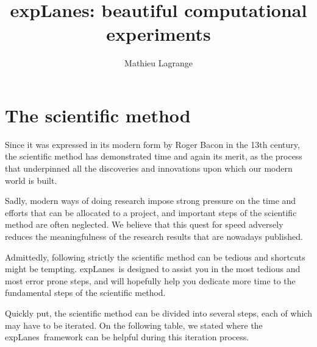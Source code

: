 \documentclass[a4paper,fleqn]{tufte-handout}
\title{ expLanes: beautiful computational experiments }
\author{ Mathieu Lagrange }
\makeatletter
\newcommand{\explanes}{\textsf{expLanes}\ }
\renewcommand{\tableofcontents}[1][]{%
  \section*{#1}
  \begin{multicols}{2}
    \@starttoc{toc}
  \end{multicols}
}
\makeatother
\begin{document}
 
  
\maketitle 
\vspace{-1.5cm}
\tableofcontents


\section{The scientific method}
\hypertarget{science}{}
 
Since it was expressed in its modern form by Roger Bacon in the 13th century, the scientific method has demonstrated time and again its merit, as the process that underpinned all the discoveries and innovations upon which our modern world is built. 

Sadly, modern ways of doing research impose strong pressure on the time and efforts that can be allocated to a project, and important steps of the scientific method are often neglected. We believe that this quest for speed adversely reduces the meaningfulness of the research results that are nowadays published. 

Admittedly, following strictly the scientific method can be tedious and shortcuts might be tempting. \explanes is designed to assist you in the most tedious and most error prone steps, and will hopefully help you dedicate more time to the fundamental steps of the scientific method.

\newpage

Quickly put, the scientific method can be divided into several steps, each of which may have to be iterated. On the following table, we stated where the \explanes framework can be helpful during this iteration process.
\end{document}
